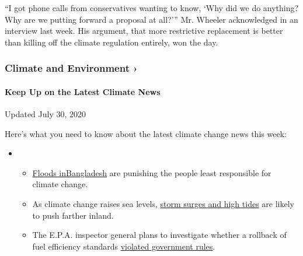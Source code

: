 ``I got phone calls from conservatives wanting to know, `Why did we do
anything? Why are we putting forward a proposal at all?''' Mr. Wheeler
acknowledged in an interview last week. His argument, that more
restrictive replacement is better than killing off the climate
regulation entirely, won the day.

\href{https://www.nytimes.com/section/climate?action=click\&pgtype=Article\&state=default\&region=MAIN_CONTENT_1\&context=storylines_keepup}{}

\hypertarget{climate-and-environment-}{%
\subsubsection{Climate and Environment
›}\label{climate-and-environment-}}

\hypertarget{keep-up-on-the-latest-climate-news}{%
\paragraph{Keep Up on the Latest Climate
News}\label{keep-up-on-the-latest-climate-news}}

Updated July 30, 2020

Here's what you need to know about the latest climate change news this
week:

\begin{itemize}
\item
  \begin{itemize}
  \tightlist
  \item
    \href{https://www.nytimes.com/2020/07/30/climate/bangladesh-floods.html?action=click\&pgtype=Article\&state=default\&region=MAIN_CONTENT_1\&context=storylines_keepup}{Floods
    in}\href{https://www.nytimes.com/2020/07/30/climate/bangladesh-floods.html?action=click\&pgtype=Article\&state=default\&region=MAIN_CONTENT_1\&context=storylines_keepup}{Bangladesh}
    are punishing the people least responsible for climate change.
  \item
    As climate change raises sea levels,
    \href{https://www.nytimes.com/2020/07/30/climate/sea-level-inland-floods.html?action=click\&pgtype=Article\&state=default\&region=MAIN_CONTENT_1\&context=storylines_keepup}{storm
    surges and high tides} are likely to push farther inland.
  \item
    The E.P.A. inspector general plans to investigate whether a rollback
    of fuel efficiency standards
    \href{https://www.nytimes.com/2020/07/27/climate/trump-fuel-efficiency-rule.html?action=click\&pgtype=Article\&state=default\&region=MAIN_CONTENT_1\&context=storylines_keepup}{violated
    government rules}.
  \end{itemize}
\end{itemize}

